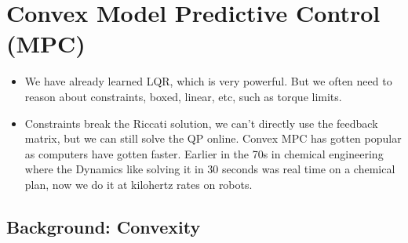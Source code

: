 \section{Convex Model Predictive Control (MPC)}

\begin{itemize}
    \item We have already learned LQR, which is very powerful. But we often need to reason about constraints, boxed, linear, etc, such as torque limits.
    \item Constraints break the Riccati solution, we can't directly use the feedback matrix, but we can still solve the QP online. Convex MPC has gotten popular as computers have gotten faster. Earlier in the 70s in chemical engineering where the Dynamics like solving it in 30 seconds was real time on a chemical plan, now we do it at kilohertz rates on robots.
\end{itemize}

\subsection{Background: Convexity}

